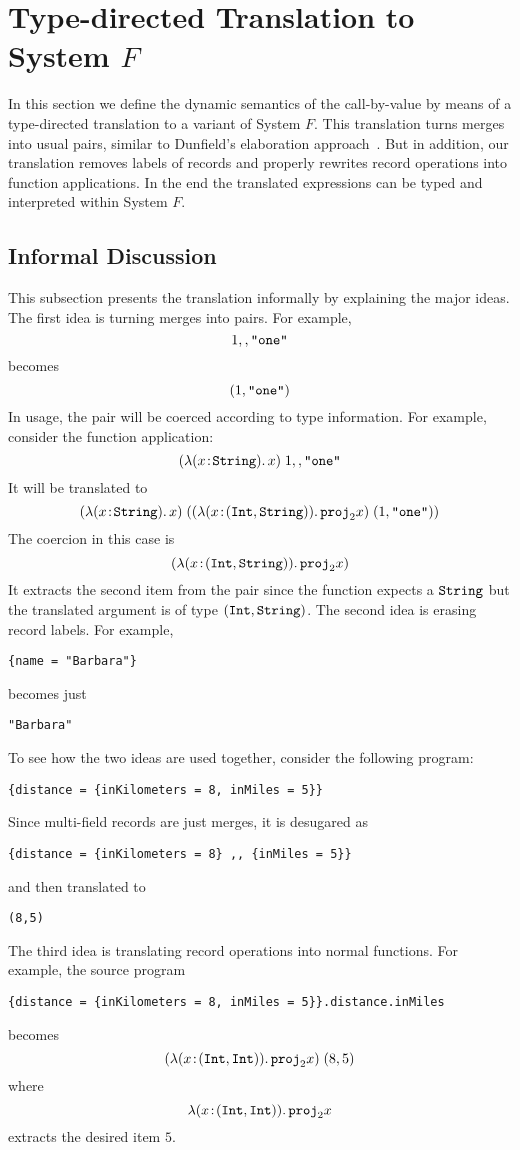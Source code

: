 \section{Type-directed Translation to System $ F $}

In this section we define the dynamic semantics of the call-by-value \name by
means of a type-directed translation to a variant of System $F$. This
translation turns merges into usual pairs, similar to Dunfield's elaboration
approach~\cite{dunfield2014elaborating,}. But in addition, our translation
removes labels of records and properly rewrites record operations into function
applications. In the end the translated expressions can be typed and interpreted
within System $F$.

\subsection{Informal Discussion}

This subsection presents the translation informally by explaining the major
ideas. The first idea is turning merges into pairs. For example,
\[
1 ,, \texttt{"one"}
\]
becomes
\[
(1, \texttt{"one"})
\]
In usage, the pair will be coerced according to type information. For example,
consider the function application:
\[
(\lambda (x \!:\! \texttt{String}).\, x) \; 1 ,, \texttt{"one"}
\]
It will be translated to
\[
(\lambda (x \!:\! \texttt{String}).\, x) \; ((\lambda (x \!:\! (\texttt{Int}, \texttt{String})).\, {\texttt{proj}}_{2} x) \; (1, \texttt{"one"}))
\]
The coercion in this case is
\[
(\lambda (x \!:\! (\texttt{Int}, \texttt{String})).\, {\texttt{proj}}_{2} x)
\]
It extracts the second item from the pair since the function expects a $\texttt{String}$
but the translated argument is of type $(\texttt{Int}, \texttt{String})$. The second idea is
erasing record labels. For example,
\begin{lstlisting}
{name = "Barbara"}
\end{lstlisting}
becomes just
\begin{lstlisting}
"Barbara"
\end{lstlisting}
To see how the two ideas are used together, consider the following program:
\begin{lstlisting}
{distance = {inKilometers = 8, inMiles = 5}}
\end{lstlisting}
Since multi-field records are just merges, it is desugared as
\begin{lstlisting}
{distance = {inKilometers = 8} ,, {inMiles = 5}}
\end{lstlisting}
and then translated to
\begin{lstlisting}
(8,5)
\end{lstlisting}
The third idea is translating record operations into normal functions. For
example, the source program
\begin{lstlisting}
{distance = {inKilometers = 8, inMiles = 5}}.distance.inMiles
\end{lstlisting}
becomes
\[
(\lambda (x \!:\! (\texttt{Int}, \texttt{Int})).\, {\texttt{proj}}_{2} x) \; (8, 5)
\]
where
\[
\lambda (x \!:\! (\texttt{Int}, \texttt{Int})).\, {\texttt{proj}}_{2} x 
\]
extracts the desired item $5$.

